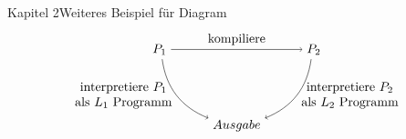 \begin{frame}{Kapitel 2}{Weiteres Beispiel für Diagram}
  \begin{equation}
    \begin{tikzpicture}[auto, baseline=(current  bounding  box.center)]
      \node (program1) at (135:3) {$P_{1}$};
      \node (program2) at (45:3) {$P_{2}$};
      \node (output)  at (270:0) {$Ausgabe$};

      \draw[->] (program1) to node[above] {kompiliere} (program2);
      \draw[->] (program1) to[bend right] node[left, align=center] {interpretiere $P_{1}$\\ als $L_{1}$ Programm} (output);
      \draw[->] (program2) to[bend left] node[right, align=center] {interpretiere $P_{2}$\\ als $L_{2}$ Programm} (output);
    \end{tikzpicture}
  \end{equation}
\end{frame}
